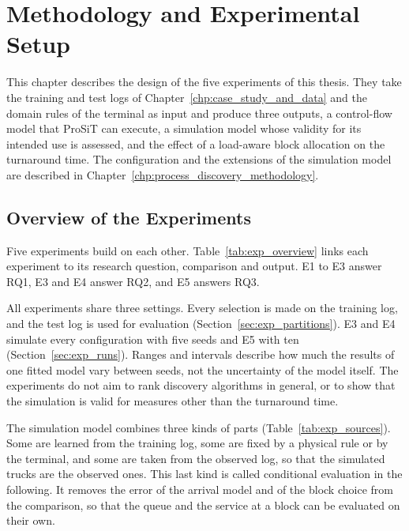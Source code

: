 \chapter{Methodology and Experimental Setup}
\label{chp:experiments}

This chapter describes the design of the five experiments of this thesis. They take
the training and test logs of Chapter~\ref{chp:case_study_and_data} and the domain
rules of the terminal as input and produce three outputs, a control-flow model that
ProSiT can execute, a simulation model whose validity for its intended use is
assessed, and the effect of a load-aware block allocation on the turnaround time.
The configuration and the extensions of the simulation model are described in
Chapter~\ref{chp:process_discovery_methodology}.

\section{Overview of the Experiments}
\label{sec:exp_overview}
\label{sec:exp_goals}
\label{sec:exp_selection_logic}

Five experiments build on each other. Table~\ref{tab:exp_overview} links each
experiment to its research question, comparison and output. E1 to E3
answer RQ1, E3 and E4 answer RQ2, and E5 answers RQ3.



All experiments share three settings. Every selection is made on the training log,
and the test log is used for evaluation (Section~\ref{sec:exp_partitions}). E3 and
E4 simulate every configuration with five seeds and E5 with ten
(Section~\ref{sec:exp_runs}). Ranges and intervals describe how much the results of
one fitted model vary between seeds, not the uncertainty of the model itself. The
experiments do not aim to rank discovery algorithms in general, or to show that the
simulation is valid for measures other than the turnaround time.

The simulation model combines three kinds of parts (Table~\ref{tab:exp_sources}).
Some are learned from the training log, some are fixed by a physical rule or by the
terminal, and some are taken from the observed log, so that the simulated trucks are
the observed ones. This last kind is called conditional evaluation in the following.
It removes the error of the arrival model and of the block choice from the
comparison, so that the queue and the service at a block can be evaluated on their own.

